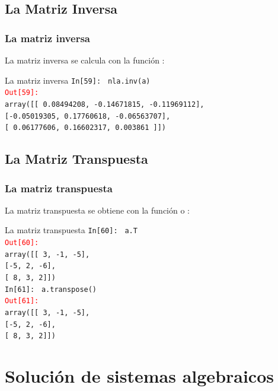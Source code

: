 \subsection{La Matriz Inversa}
\begin{frame}[fragile]
\frametitle{La matriz inversa}
La matriz inversa se calcula con la función :
\fontsize{12}{12}\selectfont
\begin{exampleblock}{La matriz inversa}
\textcolor{ao}{\texttt{In[59]: }} \texttt{nla.inv(a)} \\
\medskip
\pause
\textcolor{red}{\texttt{Out[59]: }} \\
\texttt{array([[ 0.08494208, -0.14671815, -0.11969112],} \\
\texttt{[-0.05019305,  0.17760618, -0.06563707],} \\
\texttt{[ 0.06177606,  0.16602317,  0.003861  ]])}
\end{exampleblock}
\end{frame}
\subsection{La Matriz Transpuesta}
\begin{frame}
\frametitle{La matriz transpuesta}
\fontsize{12}{12}\selectfont
La matriz transpuesta se obtiene con la función  o :
\begin{exampleblock}{La matriz transpuesta}
\textcolor{ao}{\texttt{In[60]: }} \texttt{a.T} \\
\medskip
\pause
\textcolor{red}{\texttt{Out[60]: }} \\
\texttt{array([[ 3, -1, -5],} \\
\texttt{[-5,  2, -6],} \\
\texttt{[ 8,  3,  2]])} \\
\medskip
\pause
\textcolor{ao}{\texttt{In[61]: }} \texttt{a.transpose()} \\
\medskip
\pause
\textcolor{red}{\texttt{Out[61]: }} \\
\texttt{array([[ 3, -1, -5],} \\
\texttt{[-5,  2, -6],} \\
\texttt{[ 8,  3,  2]])}
\end{exampleblock}
\end{frame}
\section{Solución de sistemas algebraicos}
